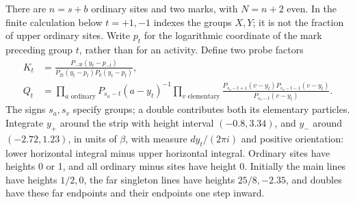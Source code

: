 There are \(n=s+b\) ordinary sites and two marks, with \(N=n+2\) even.
In the finite calculation below \(t=+1,-1\) indexes the groups
\(X,Y\); it is not the fraction of upper ordinary sites. Write
\(p_t\) for the logarithmic coordinate of the mark preceding group
\(t\), rather than for an activity.  Define two probe factors
\begin{align*}
 K_t&=\frac{P_{-3t}(y_t-p_{-t})}
 {P_{2t}(y_t-p_t)P_0(y_t-p_t)},\\
 Q_t&=\prod_{a\text{ ordinary}}P_{s_a-t}(a-y_t)^{-1}
 \prod_{v\text{ elementary}}
 \frac{P_{s_v-t+1}(v-y_t)P_{s_v-t-1}(v-y_t)}
 {P_{s_v-t}(v-y_t)}.
\end{align*}
The signs \(s_a,s_v\) specify groups; a double contributes both its
elementary particles.  Integrate \(y_+\) around the strip with height
interval \((-0.8,3.34)\), and \(y_-\) around
\((-2.72,1.23)\), in units of \(\beta\), with measure
\(dy_t/(2\pi i)\) and positive orientation: lower horizontal integral
minus upper horizontal integral.  Ordinary sites have heights 0 or 1,
and all ordinary minus sites have height 0.  Initially the main lines
have heights \(1/2,0\), the far singleton lines have heights
\(25/8,-2.35\), and doubles have these far endpoints and their endpoints
one step inward.

